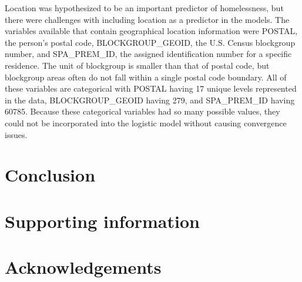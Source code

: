 \documentclass[10pt,letterpaper]{article}
\begin{document}
Location was hypothesized to be an important predictor of homelessness, but there were challenges with including location as a predictor in the models. The variables available that contain geographical location information were POSTAL, the person's postal code, BLOCKGROUP\_GEOID, the U.S. Census blockgroup number, and SPA\_PREM\_ID, the assigned identification number for a specific residence. The unit of blockgroup is smaller than that of postal code, but blockgroup areas often do not fall within a single postal code boundary. All of these variables are categorical with POSTAL having 17 unique levels represented in the data, BLOCKGROUP\_GEOID having 279, and SPA\_PREM\_ID having 60785. Because these categorical variables had so many possible values, they could not be incorporated into the logistic model without causing convergence issues.

\section*{Conclusion}

\section*{Supporting information}


\section*{Acknowledgements}

\nolinenumbers

%
%
% 





% 
\end{document}
